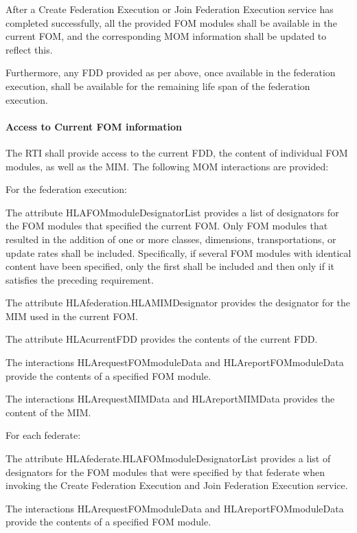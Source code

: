 After a Create Federation Execution or Join Federation Execution service has completed successfully, all the provided FOM modules shall be available in the current FOM, and the corresponding MOM information shall be updated to reflect this.

Furthermore, any FDD provided as per above, once available in the federation execution, shall be available for the remaining life span of the federation execution.

\clearpage


\paragraph{Access to Current FOM information}

The RTI shall provide access to the current FDD, the content of individual FOM modules, as well as the MIM. The following MOM interactions are provided:

\begin{stdalphalist}
    \item For the federation execution:
    \begin{stdnumlist}
        \item The attribute HLAFOMmoduleDesignatorList provides a list of designators for the FOM modules that specified the current FOM. Only FOM modules that resulted in the addition of one or more classes, dimensions, transportations, or update rates shall be included. Specifically, if several FOM modules with identical content have been specified, only the first shall be included and then only if it satisfies the preceding requirement.
        \item The attribute HLAfederation.HLAMIMDesignator provides the designator for the MIM used in the current FOM.
        \item The attribute HLAcurrentFDD provides the contents of the current FDD.
        \item The interactions HLArequestFOMmoduleData and HLAreportFOMmoduleData provide the contents of a specified FOM module.
        \item The interactions HLArequestMIMData and HLAreportMIMData provides the content of the MIM.
    \end{stdnumlist}
    \item For each federate:
    \begin{stdnumlist}
        \item The attribute HLAfederate.HLAFOMmoduleDesignatorList provides a list of designators for the FOM modules that were specified by that federate when invoking the Create Federation Execution and Join Federation Execution service.
        \item The interactions HLArequestFOMmoduleData and HLAreportFOMmoduleData provide the contents of a specified FOM module.
    \end{stdnumlist}
\end{stdalphalist}

